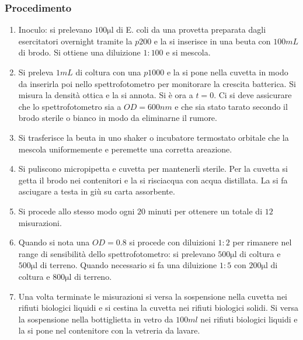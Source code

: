 		\subsubsection{Procedimento}
		\begin{enumerate}
			\item Inoculo: si prelevano $100\si{\micro\litre}$ di E. coli da una provetta preparata dagli esercitatori overnight tramite la $p200$ e la si inserisce in una beuta con $100\si{mL}$ di brodo.
				Si ottiene una diluizione $1:100$ e si mescola.
			\item Si preleva $1\si{mL}$ di coltura con una $p1000$ e la si pone nella cuvetta in modo da inserirla poi nello spettrofotometro per monitorare la crescita batterica.
				Si misura la densit\`a ottica e la si annota. Si \`e ora a $t=0$.
				Ci si deve assicurare che lo spettrofotometro sia a $OD=600\si{nm}$ e che sia stato tarato secondo il brodo sterile o bianco in modo da eliminarne il rumore.
			\item Si trasferisce la beuta in uno shaker o incubatore termostato orbitale che la mescola uniformemente e peremette una corretta areazione.
			\item Si puliscono micropipetta e cuvetta per mantenerli sterile.
				Per la cuvetta si getta il brodo nei contenitori e la si risciacqua con acqua distillata.
				La si fa asciugare a testa in giù su carta assorbente.
			\item Si procede allo stesso modo ogni $20$ minuti per ottenere un totale di $12$ misurazioni.
			\item Quando si nota una $OD=0.8$ si procede con diluizioni $1:2$ per rimanere nel range di sensibilit\`a dello spettrofotometro: si prelevano $500\si{\micro\litre}$ di coltura e $500\si{\micro\litre}$ di terreno.
				Quando necessario si fa una diluizione $1:5$ con $200\si{\micro\litre}$ di coltura e $800\si{\micro\litre}$ di terreno.
			\item Una volta terminate le misurazioni si versa la sospensione nella cuvetta nei rifiuti biologici liquidi e si cestina la cuvetta nei rifiuti biologici solidi.
				Si versa la sospensione nella bottiglietta in vetro da $100\si{ml}$ nei rifiuti biologici liquidi e la si pone nel contenitore con la vetreria da lavare.
		\end{enumerate}

